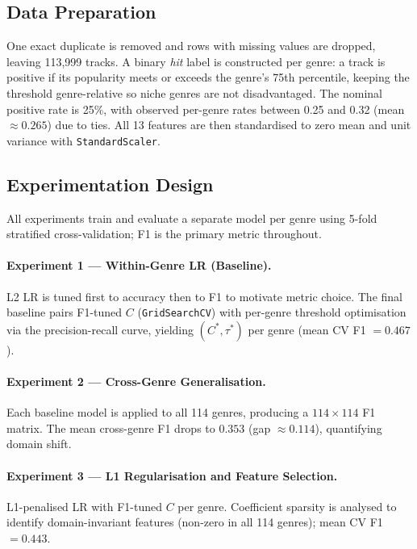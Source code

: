 \subsection{Data Preparation}

One exact duplicate is removed and rows with missing values are dropped, leaving 113{,}999 tracks. A binary \textit{hit} label is constructed per genre: a track is positive if its popularity meets or exceeds the genre's 75th percentile, keeping the threshold genre-relative so niche genres are not disadvantaged. The nominal positive rate is 25\%, with observed per-genre rates between 0.25 and 0.32 (mean $\approx 0.265$) due to ties. All 13 features are then standardised to zero mean and unit variance with \texttt{StandardScaler}.

\subsection{Experimentation Design}

All experiments train and evaluate a separate model per genre using 5-fold stratified cross-validation; F1 is the primary metric throughout.

\paragraph{Experiment 1 — Within-Genre LR (Baseline).}
L2 LR is tuned first to accuracy then to F1 to motivate metric choice. The final baseline pairs F1-tuned $C$ (\texttt{GridSearchCV}) with per-genre threshold optimisation via the precision-recall curve, yielding $(C^*, \tau^*)$ per genre (mean CV F1 $= 0.467$).

\paragraph{Experiment 2 — Cross-Genre Generalisation.}
Each baseline model is applied to all 114 genres, producing a $114\times114$ F1 matrix. The mean cross-genre F1 drops to $0.353$ (gap $\approx 0.114$), quantifying domain shift.

\paragraph{Experiment 3 — L1 Regularisation and Feature Selection.}
L1-penalised LR with F1-tuned $C$ per genre. Coefficient sparsity is analysed to identify domain-invariant features (non-zero in all 114 genres); mean CV F1 $= 0.443$.

